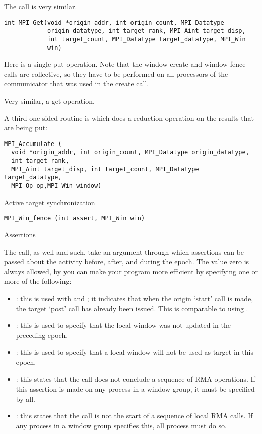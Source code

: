 The  call is very similar.
\begin{verbatim}
int MPI_Get(void *origin_addr, int origin_count, MPI_Datatype
            origin_datatype, int target_rank, MPI_Aint target_disp,
            int target_count, MPI_Datatype target_datatype, MPI_Win
            win)
\end{verbatim}

Here is a single put operation. Note that the window create and window fence calls
are collective, so they have to be performed on all processors
of the communicator that was used in the create call.

Very similar, a get operation.

A third one-sided routine
is  which does a reduction operation on the results
that are being put:
\begin{verbatim}
MPI_Accumulate (
  void *origin_addr, int origin_count, MPI_Datatype origin_datatype, 
  int target_rank,
  MPI_Aint target_disp, int target_count, MPI_Datatype target_datatype,
  MPI_Op op,MPI_Win window)
\end{verbatim}

 {Active target synchronization}

\begin{verbatim}
MPI_Win_fence (int assert, MPI_Win win)
\end{verbatim}

 {Assertions}
\label{sec:mpi-assert}

The  call, as well  and such, take an argument
through which assertions can be passed about the activity before, after, and during the epoch.
The value zero is always allowed, by you can make your program more efficient by specifying
one or more of the following:
\begin{itemize}
\item {}: this is used with
   and ; it
  indicates that when the origin `start' call is made, the target
  `post' call has already been issued. This is comparable to using
  .
\item {}: this is used to specify that
  the local window was not updated in the preceding epoch.
\item {}: this is used to specify that a local
  window will not be used as target in this epoch.
\item {}: this states that the
   call does not conclude a sequence of
  RMA operations. If this assertion is made on any process in a window group,
  it must be specified by all.
\item {}: this states that the
   call is not the start of a sequence of
  local RMA calls. If any process in a window group specifies this,
  all process must do so.
\end{itemize}

